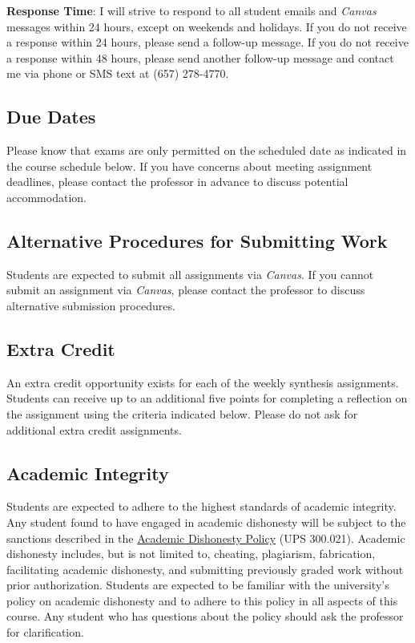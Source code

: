 \documentclass[12pt, letterpaper]{article}
\begin{document}
\textbf{Response Time}: I will strive to respond to all student emails and \emph{Canvas} messages within 24 hours, except on weekends and holidays. If you do not receive a response within 24 hours, please send a follow-up message. If you do not receive a response within 48 hours, please send another follow-up message and contact me via phone or SMS text at (657) 278-4770.

\subsection*{Due Dates}
Please know that exams are only permitted on the scheduled date as indicated in the course schedule below. If you have concerns about meeting assignment deadlines, please contact the professor in advance to discuss potential accommodation.

\subsection*{Alternative Procedures for Submitting Work}
Students are expected to submit all assignments via \emph{Canvas}. If you cannot submit an assignment via \emph{Canvas}, please contact the professor to discuss alternative submission procedures.

\subsection*{Extra Credit}
An extra credit opportunity exists for each of the weekly synthesis assignments. Students can receive up to an additional five points for completing a reflection on the assignment using the criteria indicated below. Please do not ask for additional extra credit assignments.

\subsection*{Academic Integrity}
Students are expected to adhere to the highest standards of academic integrity. Any student found to have engaged in academic dishonesty will be subject to the sanctions described in the \href{https://www.fullerton.edu/senate/publications_policies_resolutions/ups/UPS%20300/UPS%20300.021.pdf}{Academic Dishonesty Policy} (UPS 300.021). Academic dishonesty includes, but is not limited to, cheating, plagiarism, fabrication, facilitating academic dishonesty, and submitting previously graded work without prior authorization. Students are expected to be familiar with the university's policy on academic dishonesty and to adhere to this policy in all aspects of this course. Any student who has questions about the policy should ask the professor for clarification.
\end{document}
